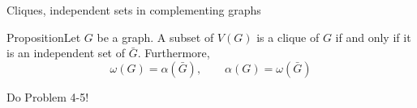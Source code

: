 \documentclass{beamer}
\def\bl[#1]#2{\begin{block}{#1}#2\end{block}}
\begin{document}
\begin{frame}{Cliques, independent sets in complementing graphs}
\bl[Proposition]{Let $G$ be a graph. A subset of $V(G)$ is a clique of $G$ if and only if it is an independent set of $\bar{G}$. Furthermore,
\[
\omega(G)=\alpha(\bar{G}),\qquad \alpha(G)=\omega(\bar{G})
\]}
\begin{center}
Do Problem 4-5!
\end{center}
\end{frame}
\end{document}
